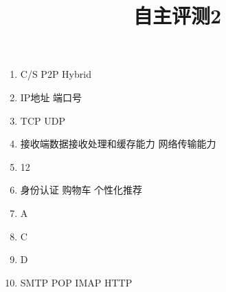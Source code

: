 \documentclass[11pt]{article}
\title{自主评测2}
\date{}
\author{}
\begin{document}
\maketitle

\begin{enumerate}
    \item C/S \quad P2P \quad Hybrid
    \item IP地址 \quad 端口号
    \item TCP \quad UDP
    \item 接收端数据接收处理和缓存能力 \quad 网络传输能力
    \item 12    
    \item 身份认证 \quad 购物车 \quad 个性化推荐
    \item A
    \item C
    \item D
    \item SMTP \quad POP \quad IMAP \quad HTTP
\end{enumerate}
\end{document}
